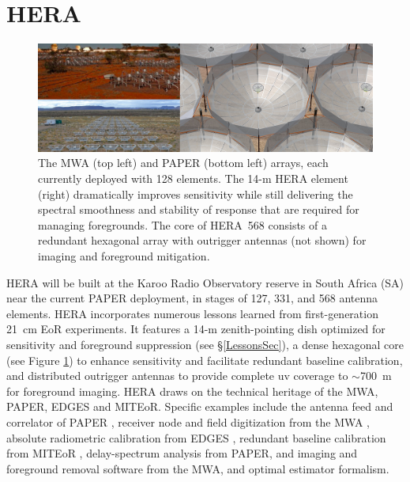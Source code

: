 \documentclass[preprint]{aastex}
\begin{document}
\vspace{-0.25in}
\section{HERA}
\label{PDsec}
\begin{figure}[t]\centering
\includegraphics[width=6.5in]{plots/PAPER_and_MWA_and_HERA.jpg}
\caption{\small
The MWA (top left) and PAPER (bottom left) arrays, each currently deployed with 128 elements.
The 14-m HERA element (right) dramatically improves sensitivity
while still delivering the spectral smoothness and stability of response that
are required for managing foregrounds.
The core of HERA~568 consists of a redundant hexagonal array with
outrigger antennas (not shown) for imaging and foreground mitigation.
}
\label{HERAfig}
\end{figure}

HERA will be built at the Karoo Radio Observatory reserve in South Africa (SA) near the
current PAPER deployment, in stages of 127, 331, and 568 antenna elements.
HERA 
incorporates numerous lessons learned from first-generation 21~cm EoR experiments.
It features a 14-m zenith-pointing dish optimized for sensitivity and foreground suppression 
(see \S\ref{LessonsSec}),
a dense hexagonal core (see Figure \ref{HERAfig}) to enhance sensitivity and facilitate 
redundant baseline calibration,
and distributed outrigger antennas to provide
complete uv coverage to $\sim$700~m for foreground imaging.
HERA draws on the technical heritage of the MWA, PAPER,
EDGES and MITEoR. Specific examples include the antenna feed and correlator of
PAPER \citep{bradley_et_al2005}, receiver node and field digitization 
from the MWA \citep{lonsdale_et_al2009_trunc,tingay_et_al2013_trunc}, absolute radiometric
calibration from EDGES \citep{rogers_2012}, redundant baseline calibration 
from MITEoR \citep{zheng_et_al2013_trunc}, 
delay-spectrum analysis from PAPER, and imaging and foreground
removal software from the MWA, and optimal estimator formalism.

\end{document}
